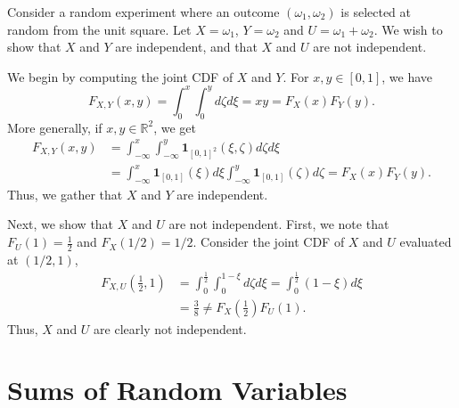 \begin{example}
Consider a random experiment where an outcome $(\omega_1, \omega_2)$ is selected at random from the unit square.
Let $X = \omega_1$, $Y = \omega_2$ and $U = \omega_1 + \omega_2$.
We wish to show that $X$ and $Y$ are independent, and that $X$ and $U$ are not independent.

We begin by computing the joint CDF of $X$ and $Y$.
For $x,y \in [0,1]$, we have
\begin{equation*}
F_{X,Y}(x,y) = \int_0^{x} \int_0^{y} d\zeta d\xi
= x y = F_X(x) F_Y(y) .
\end{equation*}
More generally, if $x, y \in \mathbb{R}^2$, we get
\begin{equation*}
\begin{split}
F_{X,Y}(x,y)
&= \int_{-\infty}^{x} \int_{-\infty}^{y}
\mathbf{1}_{[0,1]^2} (\xi, \zeta) d\zeta d\xi \\
&= \int_{-\infty}^{x} \mathbf{1}_{[0,1]} (\xi) d \xi
\int_{-\infty}^{y} \mathbf{1}_{[0,1]} (\zeta) d\zeta
= F_X(x) F_Y(y) .
\end{split}
\end{equation*}
Thus, we gather that $X$ and $Y$ are independent.

Next, we show that $X$ and $U$ are not independent.
First, we note that $F_U (1) = \frac{1}{2}$ and $F_X (1/2) = 1/2$.
Consider the joint CDF of $X$ and $U$ evaluated at $(1/2, 1)$,
\begin{equation*}
\begin{split}
F_{X,U} \left( \frac{1}{2} ,1 \right)
&= \int_{0}^{\frac{1}{2}} \int_{0}^{1-\xi} d\zeta d\xi
= \int_{0}^{\frac{1}{2}} (1 - \xi) d\xi \\
&= \frac{3}{8}
\neq F_X \left( \frac{1}{2} \right) F_U(1) .
\end{split}
\end{equation*}
Thus, $X$ and $U$ are clearly not independent.
\end{example}


\section{Sums of Random Variables}

